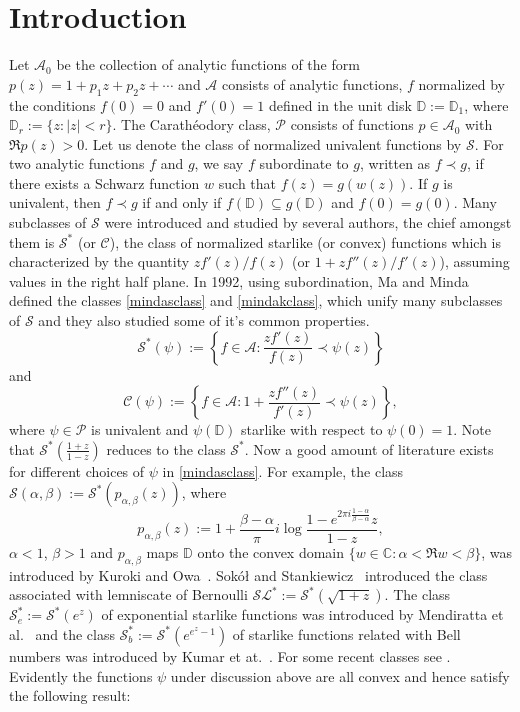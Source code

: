 \documentclass[12pt, reqno]{amsart}
\numberwithin{equation}{section}
\theoremstyle{plain}
\theoremstyle{definition}
\theoremstyle{remark}
\begin{document}
	\section{Introduction}
Let $\mathcal{A}_{0}$ be the collection of analytic functions of the form $p(z)=1+p_1z+p_2z+\cdots$ and $\mathcal{A}$ consists of analytic functions, $f$ normalized by the conditions $f(0)=0$ and $f'(0)=1$ defined in the unit disk $\mathbb{D}:=\mathbb{D}_1$, where $\mathbb{D}_r:=\{z: |z|<r\}$. The Carath\'{e}odory class, $\mathcal{P}$ consists of functions $p\in{\mathcal{A}}_0$ with $\Re{p(z)}>0$. Let us denote the class of normalized univalent functions by $\mathcal{S}$. For two analytic functions $f$  and $g$, we say $f$ subordinate to $g$, written as $f\prec g$, if there exists a Schwarz function $w$ such that $f(z)=g(w(z))$. If $g$ is univalent, then $f\prec g$ if and only if $f(\mathbb{D})\subseteq g(\mathbb{D})$ and $f(0)=g(0)$. Many subclasses of $\mathcal{S}$ were introduced and studied by several authors, the chief amongst them is $\mathcal{S}^{*}$ (or $\mathcal{C}$), the class of normalized starlike (or convex) functions which is characterized by the quantity $zf'(z)/f(z)$ (or $1+zf''(z)/f'(z)$), assuming values in the right half plane. In 1992, using subordination, Ma and Minda~\cite{minda94} defined the classes \eqref{mindasclass} and \eqref{mindakclass}, which unify many subclasses of $\mathcal{S}$ and they also studied some of it's common properties.
\begin{equation}\label{mindasclass}
\mathcal{S}^{*}(\psi):=\left\{f\in\mathcal{A}: \frac{zf'(z)}{f(z)}\prec\psi(z)\right\}
\end{equation}
and 
\begin{equation}\label{mindakclass}
\mathcal{C}(\psi):=\left\{f\in\mathcal{A}: 1+\frac{zf''(z)}{f'(z)}\prec\psi(z)\right\},
\end{equation}
where $\psi\in\mathcal{P}$ is univalent and $\psi(\mathbb{D})$ starlike with respect to $\psi(0)=1$. Note that $\mathcal{S}^{*}(\tfrac{1+z}{1-z})$ reduces to the class $\mathcal{S}^{*}$. Now a good amount of literature exists for different choices of $\psi$ in \eqref{mindasclass}. For example, the class $\mathcal{S}(\alpha,\beta):=\mathcal{S}^{*}(p_{\alpha,\beta}(z))$, where
\begin{equation}\label{s(alpha,beta)}
p_{\alpha,\beta}(z):=1+\frac{\beta-\alpha}{\pi}i\log\frac{1-e^{2\pi i\frac{1-\alpha}{\beta-\alpha}}z}{1-z},
\end{equation}
$\alpha<1$, $\beta>1$ and $p_{\alpha,\beta}$ maps $\mathbb{D}$ onto the convex domain $\{w\in\mathbb{C}: \alpha< \Re{w}<\beta\}$, was introduced by Kuroki and Owa~\cite{kurokiOwa2011}. Sok\'{o}\l\; and Stankiewicz~\cite{sokol1996} introduced the class associated with lemniscate of Bernoulli $\mathcal{SL}^{*}:=\mathcal{S}^{*}(\sqrt{1+z})$. The class $\mathcal{S}^{*}_{e}:=\mathcal{S}^{*}(e^z)$ of exponential starlike functions was introduced by Mendiratta et al.~\cite{mendi2exp} and the class $\mathcal{S}^{*}_{b}:=\mathcal{S}^{*}(e^{e^z-1})$ of starlike functions related with Bell numbers was introduced by Kumar et at.~\cite{virendraBell}. For some recent classes see \cite{raina2015,kumarravi2016,naveen14,sinefun,goel2020}. Evidently the functions $\psi$ under discussion above are all convex and hence satisfy the following result:
\end{document}
